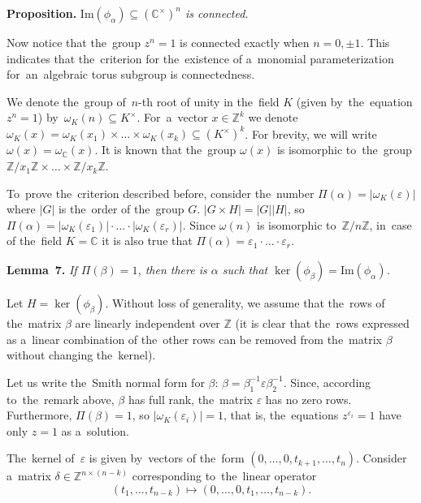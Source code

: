 \documentclass[twoside]{article}
\begin{document}
\medskip\noindent\textbf{Proposition.}\emph{
    $\mathrm{Im}(\phi_\alpha) \subseteq (\mathbb{C}^\times)^n$ is connected.
}\medskip

Now notice that the~group $z^n = 1$ is connected exactly when $n = 0, \pm 1$.
This indicates that the~criterion for the~existence of a~monomial parameterization
for~an~algebraic torus subgroup is connectedness.

We denote the~group of~$n$-th root of unity in the~field $K$ (given by~the~equation $z^n = 1$) by~$\omega_K(n) \subseteq K^\times$.
For~a~vector $x \in \mathbb{Z}^k$ we denote $\omega_K(x) = \omega_K(x_1) \times \ldots \times \omega_K(x_k) \subseteq (K^\times)^k$.
For brevity, we will write $\omega(x) = \omega_\mathbb{C}(x)$. It is known that the~group $\omega(x)$ is isomorphic
to~the~group $\mathbb{Z} / x_1 \mathbb{Z} \times \ldots \times \mathbb{Z} / x_k \mathbb{Z}$.

To~prove the~criterion described before, consider the~number $\Pi(\alpha) = |\omega_K(\varepsilon)|$
where $|G|$ is the~order of the~group $G$. $|G \times H| = |G| |H|$, so $\Pi(\alpha) = |\omega_K(\varepsilon_1)| \cdot \ldots \cdot |\omega_K(\varepsilon_r)|$.
Since $\omega(n)$ is isomorphic to~$\mathbb{Z} / n \mathbb{Z}$, in~case of the~field $K = \mathbb{C}$ it is also true that
$\Pi(\alpha) = \varepsilon_1 \cdot \ldots \cdot \varepsilon_r$.

\medskip\noindent\textbf{Lemma~7.}\emph{
    If $\Pi(\beta) = 1$, then there is $\alpha$ such that $\ker(\phi_\beta) = \mathrm{Im}(\phi_\alpha)$.
}\medskip

    Let $H = \ker(\phi_\beta)$. Without loss of generality, we assume that the~rows of the~matrix $\beta$ are linearly independent
    over $\mathbb{Z}$ (it is clear that the~rows expressed as a~linear combination of the~other rows can be removed from the~matrix $\beta$
    without changing the~kernel).

    Let us write the~Smith normal form for $\beta$: $\beta = \beta_1^{-1} \varepsilon \beta_2^{-1}$.
    Since, according to~the~remark above, $\beta$ has full rank, the~matrix $\varepsilon$ has no zero rows.
    Furthermore, $\Pi(\beta) = 1$, so $|\omega_K(\varepsilon_i)| = 1$, that is, the~equations $z^{\varepsilon_i} = 1$
    have only $z = 1$ as a~solution.

    The~kernel of~$\varepsilon$ is given by~vectors of the~form $(0,\allowbreak \ldots,\allowbreak 0,\allowbreak t_{k + 1},\allowbreak \ldots, t_{n})$.
    Consider a~matrix $\delta \in \mathbb{Z}^{n \times (n - k)}$ corresponding to~the~linear operator
    $$
        (t_1, \ldots, t_{n - k}) \mapsto (0, \ldots, 0, t_1, \ldots, t_{n - k}).
    $$
\end{document}
